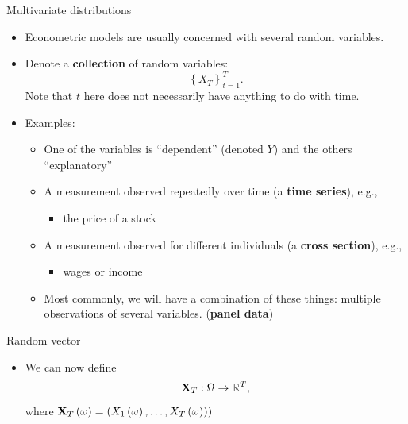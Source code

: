 \documentclass[aspectratio=169,11pt]{beamer}
\begin{document}
\begin{frame}{Multivariate distributions}
\begin{itemize}
	\item Econometric models are usually concerned with several random variables.

	\item Denote a {\bf collection} of random variables:\[
		\left\{ X_T\right\}_{t=1}^{T}.
	\]
	Note that $t$ here does not necessarily have anything to do with time.

	\item Examples:
	\begin{itemize}
		\item One of the variables  is ``dependent'' (denoted $Y$) and the others ``explanatory''

		\item A measurement observed repeatedly over time (a {\bf time series}), e.g.,
		\begin{itemize}
			\item the price of a stock
		\end{itemize}

		\item A measurement observed for different individuals (a {\bf cross section}), e.g.,
		\begin{itemize}
			\item wages or income
		\end{itemize}
		\item Most commonly, we will have a combination of these things: multiple observations of several variables. ({\bf panel data})
	\end{itemize}
\end{itemize}
\end{frame}



\begin{frame}{Random vector}
\begin{itemize}
	\item We can now define\[
	{\bf X}_T: \Omega \rightarrow \mathbb{R}^T,
\]
where ${\bf X}_T\left(\omega\right) = \left(X_1\left(\omega\right),\dots,X_T\left(\omega)\right)\right)$
\end{itemize}
\end{frame}
\end{document}
